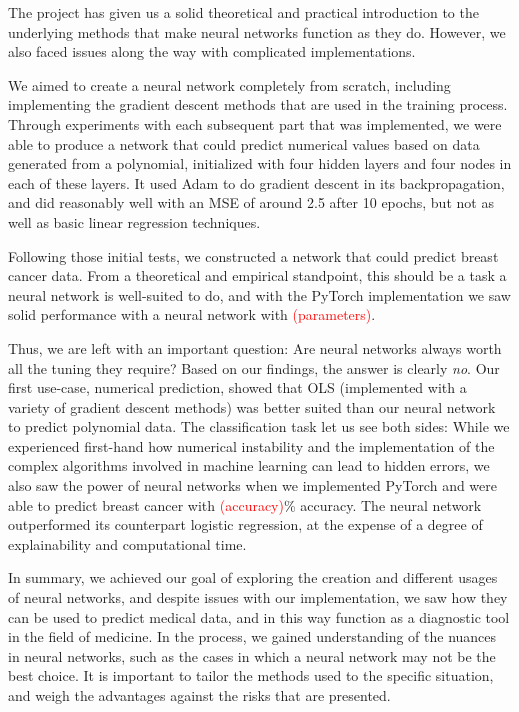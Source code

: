 The project has given us a solid theoretical and practical introduction to the underlying methods that make neural networks function as they do. However, we also faced issues along the way with complicated implementations.

We aimed to create a neural network completely from scratch, including implementing the gradient descent methods that are used in the training process. Through experiments with each subsequent part that was implemented, we were able to produce a network that could predict numerical values based on data generated from a polynomial, initialized with four hidden layers and four nodes in each of these layers. It used Adam to do gradient descent in its backpropagation, and did reasonably well with an MSE of around 2.5 after 10 epochs, but not as well as basic linear regression techniques. 

Following those initial tests, we constructed a network that could predict breast cancer data. From a theoretical and empirical standpoint, this should be a task a neural network is well-suited to do, and with the PyTorch implementation we saw solid performance with a neural network with \textcolor{red}{(parameters)}.

Thus, we are left with an important question: Are neural networks always worth all the tuning they require? Based on our findings, the answer is clearly \emph{no}. Our first use-case, numerical prediction, showed that OLS (implemented with a variety of gradient descent methods) was better suited than our neural network to predict polynomial data. The classification task let us see both sides: While we experienced first-hand how numerical instability and the implementation of the complex algorithms involved in machine learning can lead to hidden errors, we also saw the power of neural networks when we implemented PyTorch and were able to predict breast cancer with \textcolor{red}{(accuracy)}\% accuracy. The neural network outperformed its counterpart logistic regression, at the expense of a degree of explainability and computational time. 

In summary, we achieved our goal of exploring the creation and different usages of neural networks, and despite issues with our implementation, we saw how they can be used to predict medical data, and in this way function as a diagnostic tool in the field of medicine. In the process, we gained understanding of the nuances in neural networks, such as the cases in which a neural network may not be the best choice. It is important to tailor the methods used to the specific situation, and weigh the advantages against the risks that are presented.